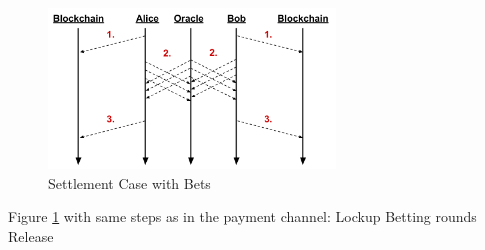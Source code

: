 \begin{figure}[!t]
\centering
\includegraphics[width=3.0in]{images/settle2.png}
\caption{Settlement Case with Bets}
\label{mpc_settle}
\end{figure}

Figure \ref{mpc_settle} with same steps as in the payment channel:
         Lockup
         Betting rounds
         Release

